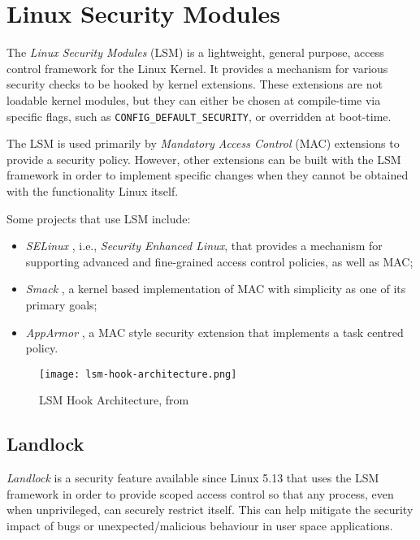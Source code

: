 \section{Linux Security Modules}

The \textit{Linux Security Modules} (LSM) \cite{lsm-2002, kernel-lsm}
is a lightweight, general purpose, access control framework for the Linux Kernel.
It provides a mechanism for various security checks to be hooked by kernel extensions.
These extensions are not loadable kernel modules, but they can either be chosen at
compile-time via specific flags, such as \texttt{CONFIG\_DEFAULT\_SECURITY}, or overridden at boot-time.

The LSM is used primarily by \textit{Mandatory Access Control} (MAC) extensions to
provide a security policy. However, other extensions can be built with the LSM framework
in order to implement specific changes when they cannot be obtained with the functionality Linux itself.

Some projects that use LSM include:
\begin{itemize}
  \item \textit{SELinux} \cite{selinux}, i.e., \textit{Security Enhanced Linux}, that provides a mechanism for supporting advanced and fine-grained access control policies, as well as MAC;
  \item \textit{Smack} \cite{smack}, a kernel based implementation of MAC with simplicity as one of its primary goals;
  \item \textit{AppArmor} \cite{apparmor}, a MAC style security extension that implements a task centred policy.
\end{itemize}

\begin{figure}[ht]
  \centering
  \texttt{[image: lsm-hook-architecture.png]}
  \caption{LSM Hook Architecture, from \cite{lsm-2002}}
  \label{fig:lsm-hook-architecture}
\end{figure}

\subsection{Landlock}
\label{sec:intro-lsm-landlock}

\textit{Landlock} \cite{landlock-kernel, landlock-user-space} is a security feature available since Linux 5.13
that uses the LSM framework in order to provide scoped access control
so that any process, even when unprivileged, can securely restrict itself.
This can help mitigate the security impact of bugs or unexpected/malicious behaviour
in user space applications.

